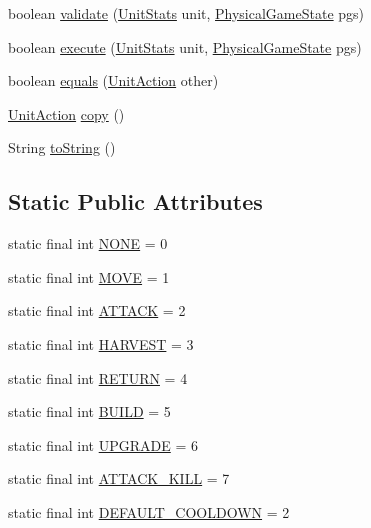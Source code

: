 \begin{DoxyCompactItemize}
boolean \hyperlink{classrts_1_1units_1_1_unit_action_afe4c06643af81bcfc21829537c504876}{validate} (\hyperlink{classrts_1_1units_1_1_unit_stats}{UnitStats} unit, \hyperlink{classrts_1_1_physical_game_state}{PhysicalGameState} pgs)
\item 
boolean \hyperlink{classrts_1_1units_1_1_unit_action_a8593750871d8d42e0a87cb32199e3060}{execute} (\hyperlink{classrts_1_1units_1_1_unit_stats}{UnitStats} unit, \hyperlink{classrts_1_1_physical_game_state}{PhysicalGameState} pgs)
\item 
boolean \hyperlink{classrts_1_1units_1_1_unit_action_a3b604970c51fd54eea009a4d95fd7b5e}{equals} (\hyperlink{classrts_1_1units_1_1_unit_action}{UnitAction} other)
\item 
\hyperlink{classrts_1_1units_1_1_unit_action}{UnitAction} \hyperlink{classrts_1_1units_1_1_unit_action_a9ea1ecb9c2c781eac3e5a5da27e4f810}{copy} ()
\item 
String \hyperlink{classrts_1_1units_1_1_unit_action_a9199e88107bdadb9a554be5fd4b95a5b}{toString} ()
\end{DoxyCompactItemize}
\subsection*{Static Public Attributes}
\begin{DoxyCompactItemize}
\item 
static final int \hyperlink{classrts_1_1units_1_1_unit_action_a0a91b5db9e5713ae6bc07d32efcae1b1}{NONE} = 0
\item 
static final int \hyperlink{classrts_1_1units_1_1_unit_action_ae0c44a5741be60dc9e2d17bd7cbab0c3}{MOVE} = 1
\item 
static final int \hyperlink{classrts_1_1units_1_1_unit_action_ac7dc8c479850fc28ba6c58d217b82936}{ATTACK} = 2
\item 
static final int \hyperlink{classrts_1_1units_1_1_unit_action_af9e653a5d2fb925d3e15f96849f0586a}{HARVEST} = 3
\item 
static final int \hyperlink{classrts_1_1units_1_1_unit_action_af700ddb351f336079eda218ec47a9e92}{RETURN} = 4
\item 
static final int \hyperlink{classrts_1_1units_1_1_unit_action_a69b96542b4c5f0d3fb7676183d62f0bd}{BUILD} = 5
\item 
static final int \hyperlink{classrts_1_1units_1_1_unit_action_a5e2222e4d632ae47b64a7e7ae2fe82b1}{UPGRADE} = 6
\item 
static final int \hyperlink{classrts_1_1units_1_1_unit_action_ab0b5666fd15fa8981e2abb48b8c277e9}{ATTACK\_\-KILL} = 7
\item 
static final int \hyperlink{classrts_1_1units_1_1_unit_action_a0462fdf20229245768be2a8382c58ca7}{DEFAULT\_\-COOLDOWN} = 2
\end{DoxyCompactItemize}

